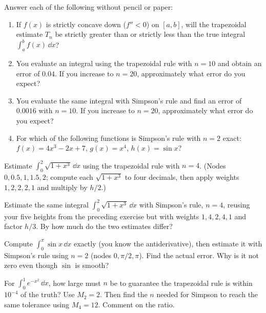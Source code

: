 \begin{exercise}
Answer each of the following without pencil or paper:
\begin{enumerate}[label=(\alph*)]
\item If $f(x)$ is strictly concave down ($f'' < 0$) on $[a,b]$, will the trapezoidal estimate $T_n$ be strictly greater than or strictly less than the true integral $\int_a^b f(x)\,\dd x$?
\item You evaluate an integral using the trapezoidal rule with $n = 10$ and obtain an error of $0.04$. If you increase to $n = 20$, approximately what error do you expect?
\item You evaluate the same integral with Simpson's rule and find an error of $0.0016$ with $n = 10$. If you increase to $n = 20$, approximately what error do you expect?
\item For which of the following functions is Simpson's rule with $n = 2$ exact: $f(x) = 4x^3 - 2x + 7$, $g(x) = x^4$, $h(x) = \sin x$?
\end{enumerate}
\end{exercise}

\begin{exercise}
Estimate $\int_0^2 \sqrt{1 + x^3}\,\dd x$ using the trapezoidal rule with $n = 4$. (Nodes $0, 0.5, 1, 1.5, 2$; compute each $\sqrt{1+x^3}$ to four decimals, then apply weights $1,2,2,2,1$ and multiply by $h/2$.)
\end{exercise}

\begin{exercise}
Estimate the same integral $\int_0^2 \sqrt{1+x^3}\,\dd x$ with Simpson's rule, $n = 4$, reusing your five heights from the preceding exercise but with weights $1,4,2,4,1$ and factor $h/3$. By how much do the two estimates differ?
\end{exercise}

\begin{exercise}
Compute $\int_0^{\pi} \sin x\,\dd x$ exactly (you know the antiderivative), then estimate it with Simpson's rule using $n = 2$ (nodes $0, \pi/2, \pi$). Find the actual error. Why is it not zero even though $\sin$ is smooth?
\end{exercise}

\begin{exercise}
For $\int_0^1 e^{-x^2}\,\dd x$, how large must $n$ be to guarantee the trapezoidal rule is within $10^{-4}$ of the truth? Use $M_2 = 2$. Then find the $n$ needed for Simpson to reach the same tolerance using $M_4 = 12$. Comment on the ratio.
\end{exercise}

